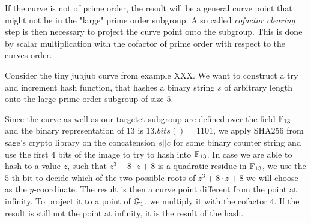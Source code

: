 If the curve is not of prime order, the result will be a general curve point that might not be in the "large" prime order subgroup. A so called \textit{cofactor clearing} step is then necessary to project the curve point onto the subgroup. This is done by scalar multiplication with the cofactor of prime order with respect to the curves order.
\begin{example} Consider the tiny jubjub curve from example XXX. We want to construct a try and increment hash function, that hashes a binary string $s$ of arbitrary length onto the large prime order subgroup of size $5$. 

Since the curve as well as our targetet subgroup are defined over the field $\mathbb{F}_{13}$ and the binary representation of $13$ is $13.bits()=1101$, we apply SHA256 from sage's crypto library on the concatension $s||c$ for some binary counter string and use the first $4$ bits of the image to try to hash into $\mathbb{F}_{13}$. In case we are able to hash to a value $z$, such that $z^3 +8\cdot z + 8$ is a quadratic residue in $\mathbb{F}_{13}$, we use the $5$-th bit to decide which of the two possible roots of $z^3 + 8\cdot z + 8$ we will choose as the $y$-coordinate. The result is then a curve point different from the point at infinity. To project it to a point of $\mathbb{G}_1$, we multiply it with the cofactor $4$. If the result is still not the point at infinity, it is the result of the hash.


\end{example}

